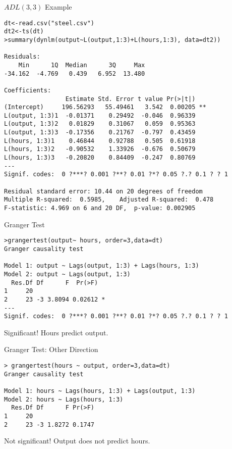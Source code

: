 \documentclass[aspectratio=169]{beamer}
\begin{document}
\begin{frame}[fragile]{$ADL(3,3)$ Example}
\tiny
\begin{verbatim}
dt<-read.csv("steel.csv")
dt2<-ts(dt)
>summary(dynlm(output~L(output,1:3)+L(hours,1:3), data=dt2))

Residuals:
    Min      1Q  Median      3Q     Max 
-34.162  -4.769   0.439   6.952  13.480 

Coefficients:
                 Estimate Std. Error t value Pr(>|t|)   
(Intercept)     196.56293   55.49461   3.542  0.00205 **
L(output, 1:3)1  -0.01371    0.29492  -0.046  0.96339   
L(output, 1:3)2   0.01829    0.31067   0.059  0.95363   
L(output, 1:3)3  -0.17356    0.21767  -0.797  0.43459   
L(hours, 1:3)1    0.46844    0.92788   0.505  0.61918   
L(hours, 1:3)2   -0.90532    1.33926  -0.676  0.50679   
L(hours, 1:3)3   -0.20820    0.84409  -0.247  0.80769   
---
Signif. codes:  0 ?***? 0.001 ?**? 0.01 ?*? 0.05 ?.? 0.1 ? ? 1

Residual standard error: 10.44 on 20 degrees of freedom
Multiple R-squared:  0.5985,	Adjusted R-squared:  0.478 
F-statistic: 4.969 on 6 and 20 DF,  p-value: 0.002905
\end{verbatim}

\end{frame}


\begin{frame}[fragile]{Granger Test}
\begin{verbatim}
>grangertest(output~ hours, order=3,data=dt)
Granger causality test

Model 1: output ~ Lags(output, 1:3) + Lags(hours, 1:3)
Model 2: output ~ Lags(output, 1:3)
  Res.Df Df      F  Pr(>F)  
1     20                    
2     23 -3 3.8094 0.02612 *
---
Signif. codes:  0 ?***? 0.001 ?**? 0.01 ?*? 0.05 ?.? 0.1 ? ? 1
\end{verbatim}
Significant! Hours predict output.
\end{frame}

\begin{frame}[fragile]{Granger Test: Other Direction}
\begin{verbatim}
> grangertest(hours ~ output, order=3,data=dt)
Granger causality test

Model 1: hours ~ Lags(hours, 1:3) + Lags(output, 1:3)
Model 2: hours ~ Lags(hours, 1:3)
  Res.Df Df      F Pr(>F)
1     20                 
2     23 -3 1.8272 0.1747
\end{verbatim}
Not significant! Output does not predict hours.
\end{frame}
\end{document}
